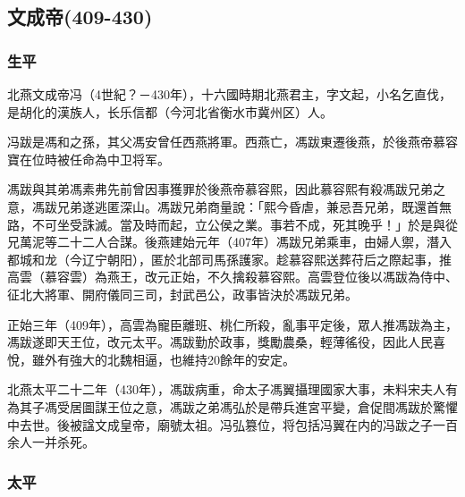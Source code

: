 
\subsection{文成帝\tiny(409-430)}

\subsubsection{生平}

北燕文成帝冯（4世紀？－430年），十六國時期北燕君主，字文起，小名乞直伐，是胡化的漢族人，长乐信都（今河北省衡水市冀州区）人。

冯跋是馮和之孫，其父馮安曾任西燕將軍。西燕亡，馮跋東遷後燕，於後燕帝慕容寶在位時被任命為中卫将军。

馮跋與其弟馮素弗先前曾因事獲罪於後燕帝慕容熙，因此慕容熙有殺馮跋兄弟之意，馮跋兄弟遂逃匿深山。馮跋兄弟商量說：「熙今昏虐，兼忌吾兄弟，既還首無路，不可坐受誅滅。當及時而起，立公侯之業。事若不成，死其晚乎！」於是與從兄萬泥等二十二人合謀。後燕建始元年（407年）馮跋兄弟乘車，由婦人禦，潛入都城和龙（今辽宁朝阳），匿於北部司馬孫護家。趁慕容熙送葬苻后之際起事，推高雲（慕容雲）為燕王，改元正始，不久擒殺慕容熙。高雲登位後以馮跋為侍中、征北大將軍、開府儀同三司，封武邑公，政事皆決於馮跋兄弟。

正始三年（409年），高雲為寵臣離班、桃仁所殺，亂事平定後，眾人推馮跋為主，馮跋遂即天王位，改元太平。馮跋勤於政事，獎勵農桑，輕薄徭役，因此人民喜悅，雖外有強大的北魏相逼，也維持20餘年的安定。

北燕太平二十二年（430年），馮跋病重，命太子馮翼攝理國家大事，未料宋夫人有為其子馮受居圖謀王位之意，馮跋之弟馮弘於是帶兵進宮平變，倉促間馮跋於驚懼中去世。後被諡文成皇帝，廟號太祖。冯弘篡位，将包括冯翼在内的冯跋之子一百余人一并杀死。

\subsubsection{太平}

